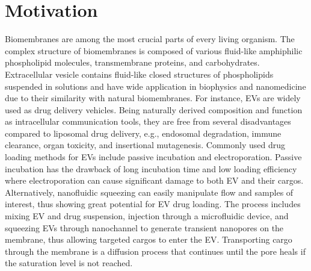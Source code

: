 \section{Motivation} \label{sec: Motivation}

Biomembranes are among the most crucial parts of every living organism. The complex structure of biomembranes is composed of various fluid-like amphiphilic phospholipid molecules, transmembrane proteins, and carbohydrates. Extracellular vesicle contains fluid-like closed structures of phospholipids suspended in solutions and have wide application in biophysics and nanomedicine due to their similarity with natural biomembranes. For instance, EVs are widely used as drug delivery vehicles\cite{a1,a2}. Being naturally derived composition and function as intracellular communication tools, they are free from several disadvantages compared to liposomal drug delivery, e.g., endosomal degradation, immune clearance, organ toxicity, and insertional mutagenesis.\cite{a3,a4,a5,a6} Commonly used drug loading methods for EVs include passive incubation and electroporation. Passive incubation has the drawback of long incubation time and low loading efficiency \cite{a7,a8,a9} where electroporation can cause significant damage to both EV and their cargos. \cite{a7,a8,a10,a11} Alternatively, nanofluidic squeezing can easily manipulate flow and samples of interest, thus showing great potential for EV drug loading\cite{a12,a13}. The process includes mixing EV and drug suspension, injection through a microfluidic device, and squeezing EVs through nanochannel to generate transient nanopores on the membrane, thus allowing targeted cargos to enter the EV. Transporting cargo through the membrane is a diffusion process that continues until the pore heals if the saturation level is not reached. 

